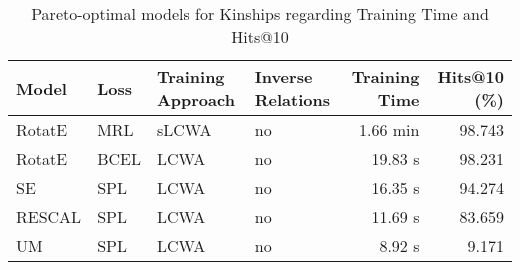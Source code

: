 \begin{table}[H]
\centering
\caption{Pareto-optimal models for Kinships regarding Training Time and Hits@10}
\label{tab:skyline_kinships_training_time}
\begin{tabular}{llllrr}
\toprule
  Model &  Loss & Training Approach & Inverse Relations & Training Time &  Hits@10 (\%) \\
\midrule
 RotatE &   MRL &             sLCWA &                no &      1.66 min &       98.743 \\
 RotatE &  BCEL &              LCWA &                no &       19.83 s &       98.231 \\
     SE &   SPL &              LCWA &                no &       16.35 s &       94.274 \\
 RESCAL &   SPL &              LCWA &                no &       11.69 s &       83.659 \\
     UM &   SPL &              LCWA &                no &        8.92 s &        9.171 \\
\bottomrule
\end{tabular}
\end{table}

